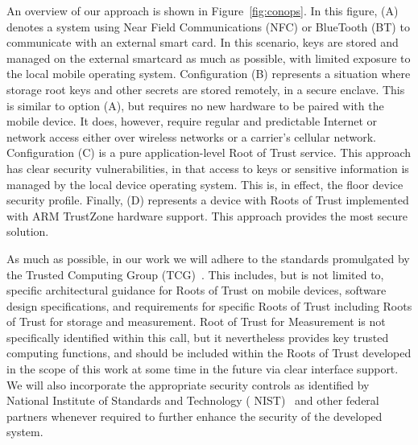 \documentclass[10pt,letterpaper]{article}
\begin{document}
An overview of our approach is shown in Figure~\ref{fig:conops}.  In this figure, (A) denotes a system using Near Field Communications (NFC) or BlueTooth (BT) to communicate with an external smart card. In this scenario, keys are stored and managed on the external smartcard as much as possible, with limited exposure to the local mobile operating system. Configuration (B) represents a situation where storage root keys and other secrets are stored remotely, in a secure enclave. This is similar to option (A), but requires no new hardware to be paired with the mobile device. It does, however, require regular and predictable Internet or network access either over wireless networks or a carrier's cellular network. Configuration (C) is a pure application-level Root of Trust service. This approach has clear security vulnerabilities, in that access to keys or sensitive information is managed by the local device operating system. This is, in effect, the floor device security profile. Finally, (D) represents a device with Roots of Trust implemented with ARM TrustZone hardware support. This approach provides the most secure solution.

As much as possible, in our work we will adhere to the standards promulgated by the Trusted Computing Group (TCG)~\cite{TPMSpec}. This includes, but is not limited to, specific architectural guidance for Roots of Trust on mobile devices, software design specifications, and requirements for specific Roots of Trust including Roots of Trust for storage and measurement. Root of Trust for Measurement is not specifically identified within this call, but it nevertheless provides key trusted computing functions, and should be included within the Roots of Trust developed in the scope of this work at some time in the future via clear interface support.  We will also incorporate the appropriate security controls as identified by National Institute of Standards and Technology ( NIST)~\cite{NIST-SP-800-53} and other federal partners whenever required to further enhance the security of the developed system.
\end{document}

